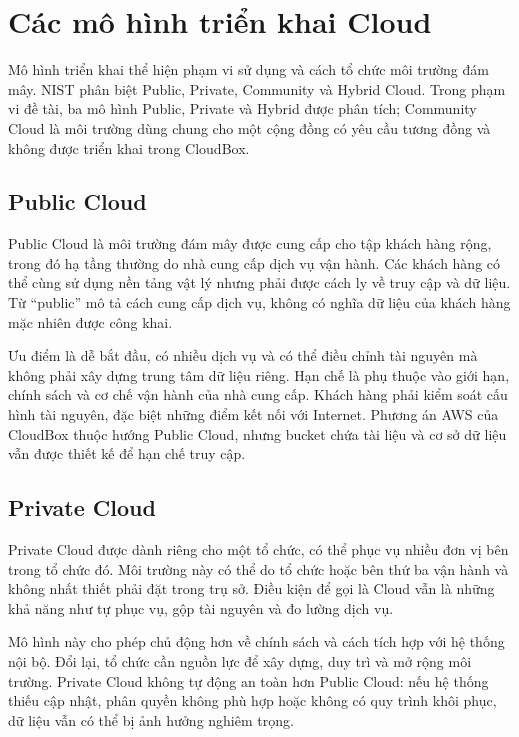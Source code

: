 \section{Các mô hình triển khai Cloud}
Mô hình triển khai thể hiện phạm vi sử dụng và cách tổ chức môi trường đám mây. NIST phân biệt Public, Private, Community và Hybrid Cloud. Trong phạm vi đề tài, ba mô hình Public, Private và Hybrid được phân tích; Community Cloud là môi trường dùng chung cho một cộng đồng có yêu cầu tương đồng và không được triển khai trong CloudBox.\cite{nistcloud}

\subsection{Public Cloud}
Public Cloud là môi trường đám mây được cung cấp cho tập khách hàng rộng, trong đó hạ tầng thường do nhà cung cấp dịch vụ vận hành. Các khách hàng có thể cùng sử dụng nền tảng vật lý nhưng phải được cách ly về truy cập và dữ liệu. Từ ``public'' mô tả cách cung cấp dịch vụ, không có nghĩa dữ liệu của khách hàng mặc nhiên được công khai.

Ưu điểm là dễ bắt đầu, có nhiều dịch vụ và có thể điều chỉnh tài nguyên mà không phải xây dựng trung tâm dữ liệu riêng. Hạn chế là phụ thuộc vào giới hạn, chính sách và cơ chế vận hành của nhà cung cấp. Khách hàng phải kiểm soát cấu hình tài nguyên, đặc biệt những điểm kết nối với Internet. Phương án AWS của CloudBox thuộc hướng Public Cloud, nhưng bucket chứa tài liệu và cơ sở dữ liệu vẫn được thiết kế để hạn chế truy cập.

\subsection{Private Cloud}
Private Cloud được dành riêng cho một tổ chức, có thể phục vụ nhiều đơn vị bên trong tổ chức đó. Môi trường này có thể do tổ chức hoặc bên thứ ba vận hành và không nhất thiết phải đặt trong trụ sở. Điều kiện để gọi là Cloud vẫn là những khả năng như tự phục vụ, gộp tài nguyên và đo lường dịch vụ.

Mô hình này cho phép chủ động hơn về chính sách và cách tích hợp với hệ thống nội bộ. Đổi lại, tổ chức cần nguồn lực để xây dựng, duy trì và mở rộng môi trường. Private Cloud không tự động an toàn hơn Public Cloud: nếu hệ thống thiếu cập nhật, phân quyền không phù hợp hoặc không có quy trình khôi phục, dữ liệu vẫn có thể bị ảnh hưởng nghiêm trọng.

